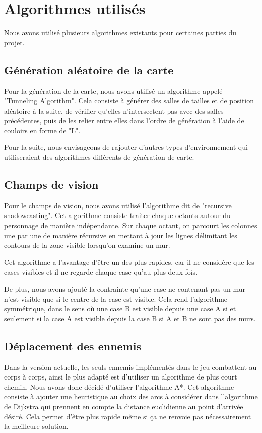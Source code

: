 \documentclass[10pt,a4paper]{article}
\begin{document}
\section{Algorithmes utilisés}

Nous avons utilisé plusieurs algorithmes existants pour certaines parties du projet. 

\subsection{Génération aléatoire de la carte}

Pour la génération de la carte, nous avons utilisé un algorithme appelé "Tunneling Algorithm". Cela consiste à générer des salles de tailles et de position aléatoire à la suite, de vérifier qu'elles n'intersectent pas avec des salles précédentes, puis de les relier entre elles dans l'ordre de génération à l'aide de couloirs en forme de "L".

Pour la suite, nous envisageons de rajouter d'autres types d'environnement qui utiliseraient des algorithmes différents de génération de carte.

\subsection{Champs de vision}

Pour le champs de vision, nous avons utilisé l'algorithme dit de "recursive shadowcasting". Cet algorithme consiste traiter chaque octants autour du personnage de manière indépendante. Sur chaque octant, on parcourt les colonnes une par une de manière récursive en mettant à jour les lignes délimitant les contours de la zone visible lorsqu'on examine un mur.

Cet algorithme a l'avantage d'être un des plus rapides, car il ne considère que les cases visibles et il ne regarde chaque case qu'au plus deux fois.

De plus, nous avons ajouté la contrainte qu'une case ne contenant pas un mur n'est visible que si le centre de la case est visible. Cela rend l'algorithme symmétrique, dans le sens où une case B est visible depuis une case A si et seulement si la case A est visible depuis la case B si A et B ne sont pas des murs.

\subsection{Déplacement des ennemis}

Dans la version actuelle, les seuls ennemis implémentés dans le jeu combattent au corps à corps, ainsi le plus adapté est d'utiliser un algorithme de plus court chemin. Nous avons donc décidé d'utiliser l'algorithme A*. Cet algorithme consiste à ajouter une heuristique au choix des arcs à considérer dans l'algorithme de Dijkstra qui prennent en compte la distance euclidienne au point d'arrivée désiré. Cela permet d'être plus rapide même si ça ne renvoie pas nécessairement la meilleure solution.
\end{document}
